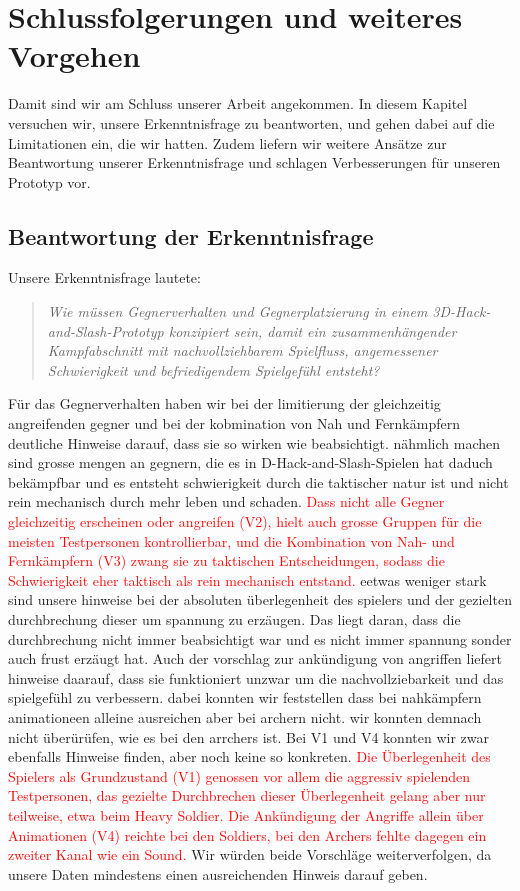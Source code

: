 \documentclass[../Main.tex]{subfiles}
\begin{document}
\section{Schlussfolgerungen und weiteres Vorgehen} \label{sec:Schlussfolgerungen}

Damit sind wir am Schluss unserer Arbeit angekommen. In diesem Kapitel versuchen wir, unsere Erkenntnisfrage zu beantworten, und gehen dabei auf die Limitationen ein, die wir hatten. Zudem liefern wir weitere Ansätze zur Beantwortung unserer Erkenntnisfrage und schlagen Verbesserungen für unseren Prototyp vor.

\subsection{Beantwortung der Erkenntnisfrage} \label{sec:Beantwortung}

Unsere Erkenntnisfrage lautete:

\begin{quote}
    \textit{Wie müssen Gegnerverhalten und Gegnerplatzierung in einem 3D-Hack-and-Slash-Prototyp konzipiert sein, damit ein zusammenhängender Kampfabschnitt mit nachvollziehbarem Spielfluss, angemessener Schwierigkeit und befriedigendem Spielgefühl entsteht?}
\end{quote}

Für das Gegnerverhalten haben wir bei der limitierung der gleichzeitig angreifenden gegner und bei der kobmination von Nah und Fernkämpfern deutliche Hinweise darauf, dass sie so wirken wie beabsichtigt. nähmlich machen sind grosse mengen an gegnern, die es in D-Hack-and-Slash-Spielen hat daduch bekämpfbar und es entsteht schwierigkeit durch die taktischer natur ist und nicht rein mechanisch durch mehr leben und schaden. \textcolor{red}{Dass nicht alle Gegner gleichzeitig erscheinen oder angreifen (V2), hielt auch grosse Gruppen für die meisten Testpersonen kontrollierbar, und die Kombination von Nah- und Fernkämpfern (V3) zwang sie zu taktischen Entscheidungen, sodass die Schwierigkeit eher taktisch als rein mechanisch entstand.} eetwas weniger stark sind unsere hinweise bei der absoluten überlegenheit des spielers und der gezielten durchbrechung dieser um spannung zu erzäugen. Das liegt daran, dass die durchbrechung nicht immer beabsichtigt war und es nicht immer spannung sonder auch frust erzäugt hat. Auch der vorschlag zur ankündigung von angriffen liefert hinweise daarauf, dass sie funktioniert unzwar um die nachvollziebarkeit und das spielgefühl zu verbessern. dabei konnten wir feststellen dass bei nahkämpfern animationeen alleine ausreichen aber bei archern nicht. wir konnten demnach nicht überürüfen, wie es bei den arrchers ist. Bei V1 und V4 konnten wir zwar ebenfalls Hinweise finden, aber noch keine so konkreten. \textcolor{red}{Die Überlegenheit des Spielers als Grundzustand (V1) genossen vor allem die aggressiv spielenden Testpersonen, das gezielte Durchbrechen dieser Überlegenheit gelang aber nur teilweise, etwa beim Heavy Soldier. Die Ankündigung der Angriffe allein über Animationen (V4) reichte bei den Soldiers, bei den Archers fehlte dagegen ein zweiter Kanal wie ein Sound.} Wir würden beide Vorschläge weiterverfolgen, da unsere Daten mindestens einen ausreichenden Hinweis darauf geben.
\end{document}
